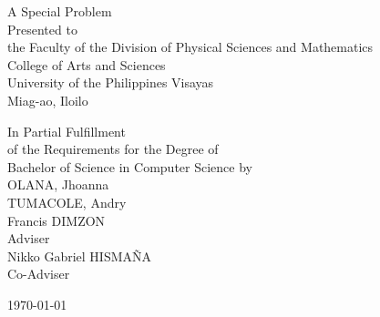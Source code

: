 \begin{titlepage}
\centering


\vspace{.5cm}
A Special Problem\\
Presented to\\
the Faculty of the Division of Physical Sciences and Mathematics\\
College of Arts and Sciences\\
University of the Philippines Visayas\\
Miag-ao, Iloilo

\vspace{.5cm}
In Partial Fulfillment\\
of the Requirements for the Degree of\\
Bachelor of Science in Computer Science
\vspace{1cm}
by\\

OLANA, Jhoanna  \\
TUMACOLE, Andry  \\

\vspace{1cm}
Francis DIMZON \\
Adviser\\
Nikko Gabriel HISMAÑA \\
Co-Adviser

\vspace{.5cm}
\today
\end{titlepage}
